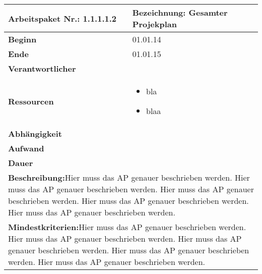 \documentclass[fontsize=12pt,paper=a4,twoside]{scrartcl}
\begin{document}
 \begin{tabular}{|p{5.3cm}|p{9.7cm}|}\hline
   \textbf{Arbeitspaket Nr.:} 1.1.1.1.2 & \textbf{Bezeichnung:} Gesamter Projekplan\\ \hline \hline
   \textbf{Beginn} & 01.01.14\\ \hline
   \textbf{Ende} & 01.01.15\\ \hline
   \textbf{Verantwortlicher} & \\ \hline
   \textbf{Ressourcen} & \begin{itemize}
   \item bla
   \item blaa
\end{itemize}    \\ \hline
\textbf{Abhängigkeit} &\\ \hline
 \textbf{Aufwand} & \\ \hline
 \textbf{Dauer} & \\ \hline
   \multicolumn{2}{|p{15cm}|}{\textbf{Beschreibung:}\newline  Hier muss das AP genauer beschrieben werden. Hier muss das AP genauer beschrieben werden. Hier muss das AP genauer beschrieben werden. Hier muss das AP genauer beschrieben werden. Hier muss das AP genauer beschrieben werden. }\\ \hline
    \multicolumn{2}{|p{15cm}|}{\textbf{Mindestkriterien:}\newline  Hier muss das AP genauer beschrieben werden. Hier muss das AP genauer beschrieben werden. Hier muss das AP genauer beschrieben werden. Hier muss das AP genauer beschrieben werden. Hier muss das AP genauer beschrieben werden. }\\ \hline
 \end{tabular}
 
\end{document}
